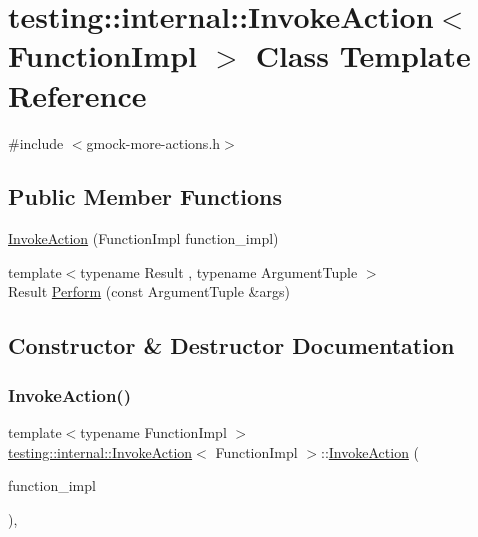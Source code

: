 \hypertarget{classtesting_1_1internal_1_1_invoke_action}{}\section{testing\+:\+:internal\+:\+:Invoke\+Action$<$ Function\+Impl $>$ Class Template Reference}
\label{classtesting_1_1internal_1_1_invoke_action}


{\ttfamily \#include $<$gmock-\/more-\/actions.\+h$>$}

\subsection*{Public Member Functions}
\begin{DoxyCompactItemize}
\item 
\hyperlink{classtesting_1_1internal_1_1_invoke_action_a786ce772624fc87a31891f465df7ce61}{Invoke\+Action} (Function\+Impl function\+\_\+impl)
\item 
{\footnotesize template$<$typename Result , typename Argument\+Tuple $>$ }\\Result \hyperlink{classtesting_1_1internal_1_1_invoke_action_af357ce691795b3520de1fda4ab8af8b2}{Perform} (const Argument\+Tuple \&args)
\end{DoxyCompactItemize}


\subsection{Constructor \& Destructor Documentation}
\mbox{\label{classtesting_1_1internal_1_1_invoke_action_a786ce772624fc87a31891f465df7ce61}} 
\subsubsection{\texorpdfstring{Invoke\+Action()}{InvokeAction()}}
{\footnotesize\ttfamily template$<$typename Function\+Impl $>$ \\
\hyperlink{classtesting_1_1internal_1_1_invoke_action}{testing\+::internal\+::\+Invoke\+Action}$<$ Function\+Impl $>$\+::\hyperlink{classtesting_1_1internal_1_1_invoke_action}{Invoke\+Action} (\begin{DoxyParamCaption}\item[{Function\+Impl}]{function\+\_\+impl }\end{DoxyParamCaption})\hspace{0.3cm}{\ttfamily [inline]}, {\ttfamily [explicit]}}



